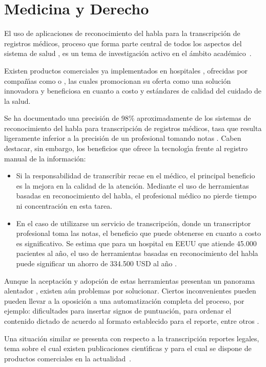 \section{Medicina y Derecho}
\label{sec:medicina}

El uso de aplicaciones de reconocimiento del habla para la transcripci\'on de registros m\'edicos, proceso 
que forma parte central de todos los aspectos del sistema de salud \cite{DavidListening2009}, 
es un tema de investigaci\'on activo en el \'ambito 
\mbox{acad\'emico \cite{LaiMedSpeak1997, HappeCombining2002}}.

Existen productos comerciales ya implementados en hospitales \cite{USATodayHospitals},
ofrecidas por compa\~n{\'\i}as como  \cite{NuanceOptimizing, NuanceSpeech} 
o  \cite{MmodalSpeech}, las cuales promocionan su oferta 
como una soluci\'on innovadora y beneficiosa en cuanto a costo y est\'andares de calidad del cuidado de la salud.

Se ha documentado una precisi\'on de 98\% aproximadamente de los sistemas de reconocimiento del habla para 
transcripci\'on de registros m\'edicos, tasa que resulta ligeramente inferior a la precisi\'on de un 
profesional tomando notas \cite{ZickVoice2001}. Caben destacar, sin embargo, los beneficios que ofrece 
la tecnolog{\'\i}a frente al registro manual de la \mbox{informaci\'on}:

\begin{itemize}
	\item Si la responsabilidad de transcribir recae en el m\'edico, el principal beneficio es la mejora en 
	la calidad de la atenci\'on.
	Mediante el uso de herramientas basadas en reconocimiento del habla, el profesional m\'edico no pierde 
	tiempo ni concentraci\'on en esta tarea.
	\item En el caso de utilizarse un servicio de transcripci\'on, donde un transcriptor profesional toma las notas,
	el beneficio que puede obtenerse en cuanto a costo es significativo. Se estima que para un 
	hospital en EEUU que atiende 45.000 pacientes al a\~no, el uso de herramientas basadas en reconocimiento 
    del habla puede significar un ahorro de 334.500 USD al a\~no \cite{ZickVoice2001}.
\end{itemize}

Aunque la aceptaci\'on y adopci\'on de estas herramientas presentan un panorama alentador \cite{GrassoLong2003}, 
existen a\'un problemas por solucionar. Ciertos inconvenientes pueden pueden llevar a 
la oposici\'on a una automatizaci\'on completa del proceso, por ejemplo: dificultades para insertar 
signos de puntuaci\'on, para ordenar el contenido dictado de acuerdo al formato establecido para el reporte,
entre otros \cite{DavidListening2009}.

Una situaci\'on similar se presenta con respecto a la transcripci\'on reportes legales, 
tema sobre el cual existen publicaciones cient{\'\i}ficas \cite{van-leeuwen2008improving, FalavignaAutomatic2009} 
y para el cual se dispone de productos comerciales en la \mbox{actualidad \cite{NuanceLegal}}.
